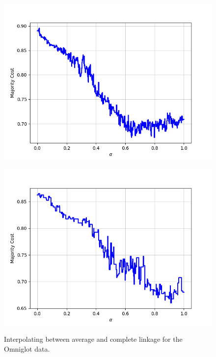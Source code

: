 \begin{figure}[H]
\begin{minipage}{.24\textwidth}
  {\includegraphics[width=\linewidth]{plots/omniglot-intra-ac/Tagalog}}
\end{minipage}
\begin{minipage}{.24\textwidth}
  \centering
  {\includegraphics[width=\linewidth]{plots/omniglot-intra-ac/Tifinagh}}
\end{minipage}
\caption{%
  Interpolating between average and complete linkage for the Omniglot data.}
\label{}
\end{figure}

